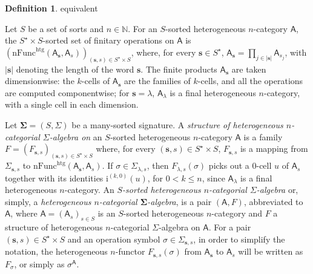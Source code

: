\documentclass[a4paper, reqno]{amsbook}
\makeatletter
\newcommand{\bb}[1]{\ensuremath{\lvert #1 \rvert}}
\newcommand{\sig}[1]{\mathbf{#1}}             %
\newcommand{\calg}[1]{\boldsymbol{\mathsf{#1}}} %
\newcommand{\htg}{\mathrm{htg}}                %
\theoremstyle{plain}
\theoremstyle{definition}
\newtheorem{definition}[theorem]{Definition}
\newcommand*{\CA@leanpending}{}
\newcommand*{\CA@leanrelation}{}
\newcommand*{\lean}[2]{%
  \ifcsname\string\color@lean@#1\endcsname\else
    \PackageError{main}{Unknown relation `#1' in \string\lean}{Use equivalent, weaker or stronger.}%
  \fi
  \gdef\CA@leanrelation{#1}%
  \gdef\CA@leanpending{#2}}
\makeatother
\begin{document}
\begin{definition}\label{DCatAlgHtg}\lean{equivalent}{Heterogeneous.NCategorialAlgebra,Heterogeneous.CategorialAlgebra}
Let $S$ be a set of sorts and $n\in\mathbb{N}$.
For an $S$-sorted heterogeneous $n$-category $\mathsf{A}$, the $S^{\star}\times S$-sorted set of finitary operations on $\mathsf{A}$ is $(\mathrm{nFunc}^{\htg}(\mathsf{A}_{\mathbf{s}},\mathsf{A}_{s}))_{(\mathbf{s},s)\in S^{\star}\times S}$, where, for every $\mathbf{s}\in S^{\star}$, $\mathsf{A}_{\mathbf{s}}=\prod_{j\in\bb{\mathbf{s}}}\mathsf{A}_{s_{j}}$, with $\bb{\mathbf{s}}$ denoting the length of the word $\mathbf{s}$.
The finite products $\mathsf{A}_{\mathbf{s}}$ are taken dimensionwise: the $k$-cells of $\mathsf{A}_{\mathbf{s}}$ are the families of $k$-cells, and all the operations are computed componentwise; for $\mathbf{s}=\lambda$, $\mathsf{A}_{\lambda}$ is a final heterogeneous $n$-category, with a single cell in each dimension.

Let $\sig{\Sigma}=(S,\Sigma)$ be a many-sorted signature.
A \emph{structure of heterogeneous $n$-categorial $\Sigma$-algebra on} an $S$-sorted heterogeneous $n$-category $\mathsf{A}$ is a family $F = (F_{\mathbf{s},s})_{(\mathbf{s},s)\in S^{\star}\times S}$ where, for every $(\mathbf{s},s)\in S^{\star}\times S$, $F_{\mathbf{s},s}$ is a mapping from $\Sigma_{\mathbf{s},s}$ to $\mathrm{nFunc}^{\htg}(\mathsf{A}_{\mathbf{s}},\mathsf{A}_{s})$.
If $\sigma\in \Sigma_{\lambda,s}$, then $F_{\lambda,s}(\sigma)$ picks out a $0$-cell $u$ of $\mathsf{A}_{s}$ together with its identities $\mathrm{i}^{(k,0)}(u)$, for $0<k\leq n$, since $\mathsf{A}_{\lambda}$ is a final heterogeneous $n$-category.
An \emph{$S$-sorted heterogeneous $n$-categorial $\Sigma$-algebra} or, simply, a \emph{heterogeneous $n$-categorial $\sig{\Sigma}$-algebra}, is a pair $(\mathsf{A},F)$, abbreviated to $\calg{A}$, where $\mathsf{A}=(\mathsf{A}_{s})_{s\in S}$ is an $S$-sorted heterogeneous $n$-category and $F$ a structure of heterogeneous $n$-categorial $\Sigma$-algebra on $\mathsf{A}$.
For a pair $(\mathbf{s},s)\in S^{\star}\times S$ and an operation symbol $\sigma\in \Sigma_{\mathbf{s},s}$, in order to simplify the notation, the heterogeneous $n$-functor $F_{\mathbf{s},s}(\sigma)$ from $\mathsf{A}_{\mathbf{s}}$ to $\mathsf{A}_{s}$ will be written as $F_{\sigma}$, or simply as $\sigma^{\calg{A}}$.


\end{definition}
\end{document}
